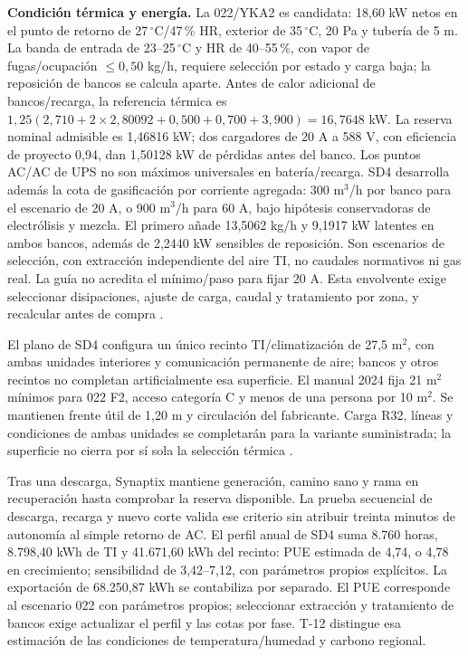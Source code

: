 \textbf{Condición térmica y energía.} La 022/YKA2 es candidata: 18,60 kW netos en el punto de retorno de 27\,$^{\circ}$C/47\,\% HR, exterior de 35\,$^{\circ}$C, 20 Pa y tubería de 5 m. La banda de entrada de 23--25\,$^{\circ}$C y HR de 40--55\,\%, con vapor de fugas/ocupación $\leq0,50$ kg/h, requiere selección por estado y carga baja; la reposición de bancos se calcula aparte. Antes de calor adicional de bancos/recarga, la referencia térmica es $1,25(2,710+2\times2,80092+0,500+0,700+3,900)=16,7648$ kW. La reserva nominal admisible es 1,46816 kW; dos cargadores de 20 A a 588 V, con eficiencia de proyecto 0,94, dan 1,50128 kW de pérdidas antes del banco. Los puntos AC/AC de UPS no son máximos universales en batería/recarga. SD4 desarrolla además la cota de gasificación por corriente agregada: 300 m$^3$/h por banco para el escenario de 20 A, o 900 m$^3$/h para 60 A, bajo hipótesis conservadoras de electrólisis y mezcla. El primero añade 13,5062 kg/h y 9,1917 kW latentes en ambos bancos, además de 2,2440 kW sensibles de reposición. Son escenarios de selección, con extracción independiente del aire TI, no caudales normativos ni gas real. La guía no acredita el mínimo/paso para fijar 20 A. Esta envolvente exige seleccionar disipaciones, ajuste de carga, caudal y tratamiento por zona, y recalcular antes de compra \parencites{p7-eaton-93t-tecnica}{p6-mext-pi-2025}{p6-mext-control-me38}.

El plano de SD4 configura un único recinto TI/climatización de 27,5 m$^2$, con ambas unidades interiores y comunicación permanente de aire; bancos y otros recintos no completan artificialmente esa superficie. El manual 2024 fija 21 m$^2$ mínimos para 022 F2, acceso categoría C y menos de una persona por 10 m$^2$. Se mantienen frente útil de 1,20 m y circulación del fabricante. Carga R32, líneas y condiciones de ambas unidades se completarán para la variante suministrada; la superficie no cierra por sí sola la selección térmica \parencite[secc.~2.2.5--2.2.7, p.~21]{p9-mext-manual-2024}.

Tras una descarga, Synaptix mantiene generación, camino sano y rama en recuperación hasta comprobar la reserva disponible. La prueba secuencial de descarga, recarga y nuevo corte valida ese criterio sin atribuir treinta minutos de autonomía al simple retorno de AC. El perfil anual de SD4 suma 8.760 horas, 8.798,40 kWh de TI y 41.671,60 kWh del recinto: PUE estimada de 4,74, o 4,78 en crecimiento; sensibilidad de 3,42--7,12, con parámetros propios explícitos. La exportación de 68.250,87 kWh se contabiliza por separado. El PUE corresponde al escenario 022 con parámetros propios; seleccionar extracción y tratamiento de bancos exige actualizar el perfil y las cotas por fase. T-12 distingue esa estimación de las condiciones de temperatura/humedad y carbono regional.

